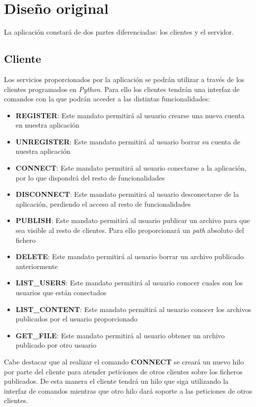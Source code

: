 \documentclass[]{article}
\begin{document}
\section{Diseño original}
\label{sec:disenno}
La aplicación constará de dos partes diferenciadas: los clientes y el servidor.

\subsection{Cliente}
\label{subsec:cliente}
Los servicios proporcionados por la aplicación se podrán utilizar a través de los clientes programados en \textit{Python}.
Para ello los clientes tendrán una interfaz de comandos con la que podrán acceder a las distintas funcionalidades:
\begin{itemize}
  \item \textbf{REGISTER}: Este mandato permitirá al usuario crearse una nueva cuenta en nuestra aplicación
  \item \textbf{UNREGISTER}: Este mandato permitirá al usuario borrar su cuenta de nuestra aplicación
  \item \textbf{CONNECT}: Este mandato permitirá al usuario conectarse a la aplicación, por lo que dispondrá del resto de funcionalidades
  \item \textbf{DISCONNECT}: Este mandato permitirá al usuario desconectarse de la aplicación, perdiendo el acceso al resto de funcionalidades
  \item \textbf{PUBLISH}: Este mandato permitirá al usuario publicar un archivo para que sea visible al resto de clientes. Para ello proporcionará un \textit{path} absoluto del fichero
  \item \textbf{DELETE}: Este mandato permitirá al usuario borrar un archivo publicado anteriormente
  \item \textbf{LIST\_USERS}: Este mandato permitirá al usuario conocer cuales son los usuarios que están conectados
  \item \textbf{LIST\_CONTENT}: Este mandato permitirá al usuario conocer los archivos publicados por el usuario proporcionado
  \item \textbf{GET\_FILE}: Este mandato permitirá al usuario obtener un archivo publicado por otro usuario
\end{itemize}

Cabe destacar que al realizar el comando \textbf{CONNECT} se creará un nuevo hilo por parte del cliente para atender peticiones de otros clientes sobre los ficheros publicados. De esta manera el cliente tendrá un hilo que siga utilizando la interfaz de comandos mientras que otro hilo dará soporte a las peticiones de otros clientes.
\end{document}
